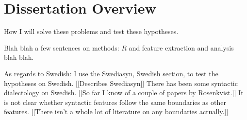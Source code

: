 



\section{Dissertation Overview}

How I will solve these problems and test these hypotheses.

Blah blah a few sentences on methods: $R$ and feature extraction and
analysis blah blah.

As regards to Swedish: I use the Swediasyn, Swedish section, to test
the hypotheses on Swedish. [[Describes Swediasyn]]
There has been some syntactic dialectology on
Swedish. [[So far I know of a couple of papers by Rosenkvist.]] It is
not clear whether syntactic features follow the same boundaries as
other features. [[There isn't a whole lot of literature on any
boundaries actually.]]

